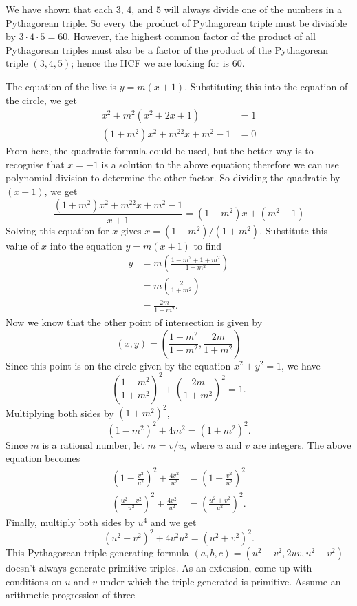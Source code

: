 We have shown that each \(3\), \(4\), and \(5\)
will always divide one of the numbers in
a Pythagorean triple. So every the product of Pythagorean triple must be divisible by \(3\cdot4\cdot5=60\). However, the highest common factor of the product of  all
Pythagorean triples must also be a factor of
the product of the Pythagorean triple \((3,4,5)\); 
hence the HCF we are looking for is \(60\).

\sol
The equation of the live is \(y=m(x+1)\).
Substituting this into the equation of the circle,
we get
\[
\begin{split}
x^2+m^2(x^2+2x+1)&=1\\
(1+m^2)x^2+m^22x+m^2-1&=0
\end{split}
\]
From here, the quadratic formula could be
used, but the better way is to recognise
that \(x=-1\) is a solution to the above
equation; therefore we can use polynomial
division to determine the other factor.
So dividing the quadratic by \((x+1)\), we
get
\[
\frac{(1+m^2)x^2+m^22x+m^2-1}{x+1}=
(1+m^2)x+(m^2-1)
\]
Solving this equation for \(x\) gives
\(x=(1-m^2)/(1+m^2)\). Substitute this
value of \(x\) into the equation \(y=m(x+1)\)
to find
\[
\begin{split}
y&=m\left(\frac{1-m^2+1+m^2}{1+m^2}\right)\\
&=m\left(\frac{2}{1+m^2}\right)\\
&=\frac{2m}{1+m^2}.
\end{split}
\]
Now we know that the other point of intersection
is given by
\[
(x,y)=\left(\frac{1-m^2}{1+m^2},\frac{2m}{1+m^2}\right)
\]
Since this point is on the circle given by the
equation \(x^2+y^2=1\), we have
\[
\left(\frac{1-m^2}{1+m^2}\right)^2+\left(\frac{2m}{1+m^2}\right)^2=1.
\]
Multiplying both sides by \((1+m^2)^2\),
\[
(1-m^2)^2+4m^2=(1+m^2)^2.
\]
Since \(m\) is a rational number, let \(m=v/u\),
where \(u\) and \(v\) are integers.
The above equation becomes
\[
\begin{split}
\left(1-\frac{v^2}{u^2}\right)^2+\frac{4v^2}{u^2}&=\left(1+\frac{v^2}{u^2}\right)^2\\
\left(\frac{u^2-v^2}{u^2}\right)^2+\frac{4v^2}{u^2}
&=\left(\frac{u^2+v^2}{u^2}\right)^2.
\end{split}
\]
Finally, multiply both sides by \(u^4\) and we
get
\[
(u^2-v^2)^2+4v^2u^2=(u^2+v^2)^2.
\]
This Pythagorean triple generating formula
\((a,b,c)=(u^2-v^2,2uv,u^2+v^2)\) doesn't
always generate primitive triples. As an extension,
come up with conditions on \(u\) and \(v\)
under which the triple generated is primitive.
\sol
Assume an arithmetic progression of three 
